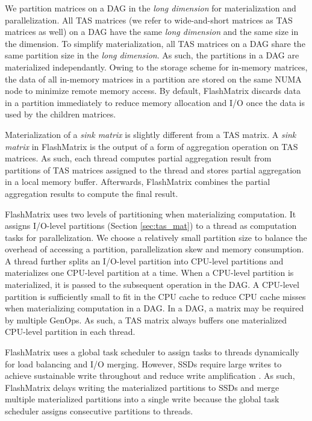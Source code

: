 We partition matrices on a DAG in the \textit{long dimension} for materialization
and parallelization. All TAS matrices (we refer to wide-and-short matrices as TAS
matrices as well) on a DAG have the same \textit{long dimension} and the same size
in the dimension. To simplify materialization, all TAS matrices on a DAG share
the same partition size in the \textit{long dimension}. As such, the partitions
in a DAG are materialized independantly. Owing to the storage scheme for
in-memory matrices, the data of all in-memory matrices in a partition are stored
on the same NUMA node to minimize remote memory access. By default, FlashMatrix
discards data in a partition immediately to reduce memory allocation and I/O
once the data is used by the children matrices.

Materialization of a \textit{sink matrix} is slightly different from a TAS matrix.
A \textit{sink matrix} in FlashMatrix is the output of a form of aggregation
operation on TAS matrices. As such, each thread computes partial aggregation
result from partitions of TAS matrices assigned to the thread and stores partial
aggregation in a local memory buffer. Afterwards, FlashMatrix combines
the partial aggregation results to compute the final result.


FlashMatrix uses two levels of partitioning when materializing computation.
It assigns I/O-level partitions (Section \ref{sec:tas_mat}) to a thread as
computation tasks for parallelization. We choose a relatively small partition
size to balance the overhead of accessing a partition, parallelization skew
and memory consumption. A thread further splits an I/O-level partition into
CPU-level partitions and materializes one CPU-level partition at a time.
When a CPU-level partition is materialized, it is passed to the subsequent
operation in the DAG. A CPU-level partition is sufficiently small to fit in
the CPU cache to reduce CPU cache misses when materializing computation in
a DAG. In a DAG, a matrix may be required by multiple GenOps. As such,
a TAS matrix always buffers one materialized CPU-level partition in each
thread. 

FlashMatrix uses a global task scheduler to assign tasks to threads dynamically
for load balancing and I/O merging. However, SSDs require large
writes to achieve sustainable write throughout and reduce write amplification
\cite{}. As such, FlashMatrix delays writing the materialized partitions to
SSDs and merge multiple materialized partitions into a single write because
the global task scheduler assigns consecutive partitions to threads.

